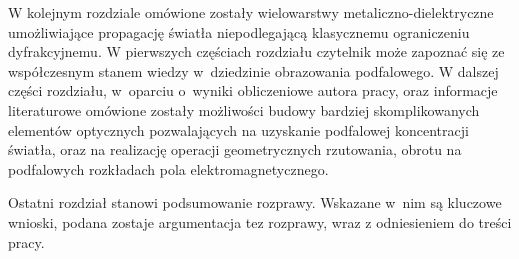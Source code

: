 W kolejnym rozdziale omówione zostały wielowarstwy metaliczno-dielektryczne umożliwiające propagację światła niepodlegającą klasycznemu ograniczeniu dyfrakcyjnemu. W pierwszych częściach rozdziału czytelnik może zapoznać się ze współczesnym stanem wiedzy w~dziedzinie obrazowania podfalowego. W dalszej części rozdziału, w~oparciu o~wyniki obliczeniowe autora pracy, oraz informacje literaturowe omówione zostały możliwości budowy bardziej skomplikowanych elementów optycznych pozwalających na uzyskanie podfalowej koncentracji światła, oraz na realizację operacji geometrycznych rzutowania, obrotu na podfalowych rozkładach pola elektromagnetycznego.

Ostatni rozdział stanowi podsumowanie rozprawy. Wskazane w~nim są kluczowe wnioski, podana zostaje argumentacja tez rozprawy, wraz z odniesieniem do treści pracy.

